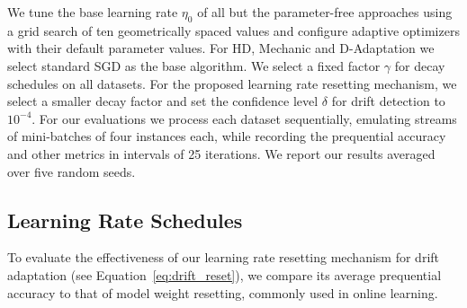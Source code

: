 \documentclass[runningheads]{llncs}
\begin{document}
We tune the base learning rate $\eta_0$ of all but the parameter-free approaches using a grid search of ten geometrically spaced values and configure adaptive optimizers with their default parameter values. For HD, Mechanic and D-Adaptation we select standard SGD as the base algorithm.
We select a fixed factor $\gamma$ for decay schedules on all datasets.
For the proposed learning rate resetting mechanism, we select a smaller decay factor and set the confidence level $\delta$ for drift detection to $10^{-4}$.
For our evaluations we process each dataset sequentially, emulating streams of mini-batches of four instances each, while recording the prequential accuracy and other metrics in intervals of 25 iterations.
We report our results averaged over five random seeds.

\subsection{Learning Rate Schedules}

To evaluate the effectiveness of our learning rate resetting mechanism for drift adaptation (see Equation~\eqref{eq:drift_reset}), we compare its average prequential accuracy to that of model weight resetting, commonly used in online learning.
\end{document}

